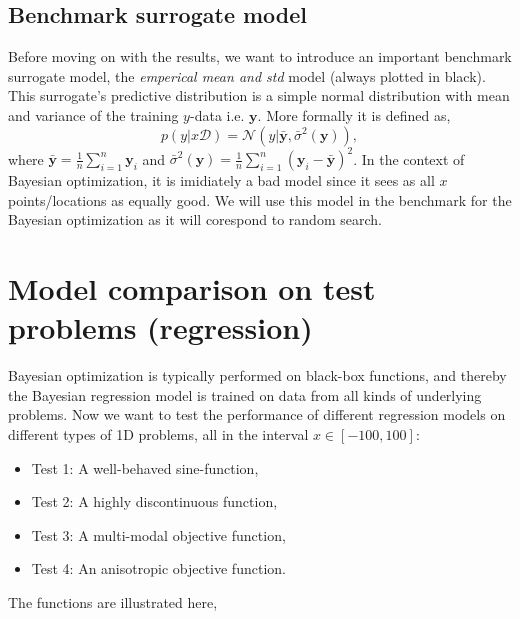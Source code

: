 \subsection{Benchmark surrogate model}
Before moving on with the results, we want to introduce an important benchmark surrogate model, the
\textit{emperical mean and std} model (always plotted in black). This surrogate's predictive distribution
is a simple normal distribution with mean and variance of the training $y$-data i.e. $\textbf{y}$. More
formally it is defined as, 
$$p(y|x\mathcal{D}) = \mathcal{N}(y| \bar{\textbf{y}} , \bar{\sigma}^2 (\textbf{y})),$$ where
$\bar{\textbf{y}} = \frac{1}{n}\sum_{i=1}^n \textbf{y}_i $ and $\bar{\sigma}^2 (\textbf{y}) =
\frac{1}{n}\sum_{i=1}^n (\textbf{y}_i-\bar{\textbf{y}})^2$. In the context of Bayesian optimization,
it is imidiately a bad model since it sees as all $x$ points/locations as equally good. We will use
this model in the benchmark for the Bayesian optimization as it will corespond to random search. 
 
\section{Model comparison on test problems (regression)}
Bayesian optimization is typically performed on black-box functions, and thereby the Bayesian
regression model is trained on data from all kinds of underlying problems. Now we want to test the
performance of different regression models on different types of 1D problems, all in the interval $x
\in [-100,100]$:

\begin{itemize}
  \item Test 1: A well-behaved sine-function,
  \item Test 2: A highly discontinuous function,
  \item Test 3: A multi-modal objective function,
  \item Test 4: An anisotropic objective function.
\end{itemize}
The functions are illustrated here,

